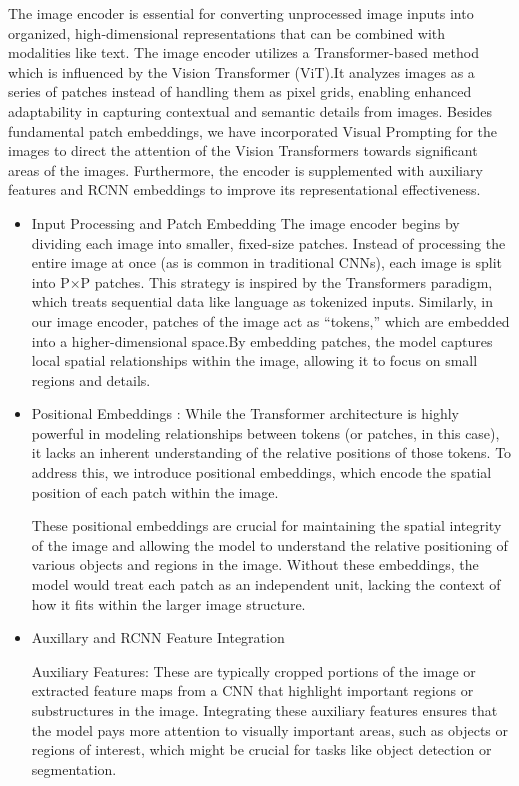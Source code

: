 The image encoder is essential for converting unprocessed image inputs into organized, high-dimensional representations that can be combined with modalities like text. The image encoder utilizes a Transformer-based method which is influenced by the Vision Transformer (ViT).It analyzes images as a series of patches instead of handling them as pixel grids, enabling enhanced adaptability in capturing contextual and semantic details from images. Besides fundamental patch embeddings, we have incorporated Visual Prompting for the images to direct the attention of the Vision Transformers towards significant areas of the images. Furthermore, the encoder is supplemented with auxiliary features and RCNN embeddings to improve its representational effectiveness. 

\begin{itemize}
   
   \item  Input Processing and Patch Embedding
The image encoder begins by dividing each image into smaller, fixed-size patches. Instead of processing the entire image at once (as is common in traditional CNNs), each image is split into 
P×P patches. This strategy is inspired by the Transformers paradigm, which treats sequential data like language as tokenized inputs. Similarly, in our image encoder, patches of the image act as “tokens,” which are embedded into a higher-dimensional space.By embedding patches, the model captures local spatial relationships within the image, allowing it to focus on small regions and details.

\item Positional Embeddings :
While the Transformer architecture is highly powerful in modeling relationships between tokens (or patches, in this case), it lacks an inherent understanding of the relative positions of those tokens. To address this, we introduce positional embeddings, which encode the spatial position of each patch within the image.

These positional embeddings are crucial for maintaining the spatial integrity of the image and allowing the model to understand the relative positioning of various objects and regions in the image. Without these embeddings, the model would treat each patch as an independent unit, lacking the context of how it fits within the larger image structure.

\item Auxillary and RCNN Feature Integration 

Auxiliary Features: These are typically cropped portions of the image or extracted feature maps from a CNN that highlight important regions or substructures in the image. Integrating these auxiliary features ensures that the model pays more attention to visually important areas, such as objects or regions of interest, which might be crucial for tasks like object detection or segmentation.


\end{itemize}
